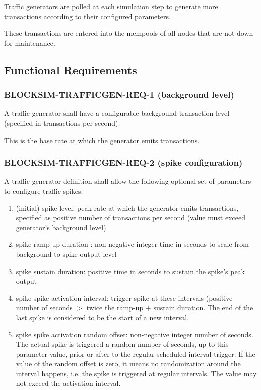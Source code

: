 \documentclass{scrreprt}
\begin{document}
Traffic generators are polled at each simulation step to generate more
transactions according to their configured parameters.

These transactions are entered into the mempools of all nodes that are not
down for maintenance.


\subsection{Functional Requirements}

\subsubsection{BLOCKSIM-TRAFFICGEN-REQ-1 (background level)}

A traffic generator shall have a configurable background transaction level
(specified in transactions per second).

This is the base rate at which the generator emits transactions.

\subsubsection{BLOCKSIM-TRAFFICGEN-REQ-2 (spike configuration)}

A traffic generator definition shall allow the following optional set of parameters to configure
traffic spikes:

\begin{enumerate}
   \item (initial) spike level: peak rate at which the generator emits transactions, specified as positive number of transactions per second (value must exceed generator's background level)
   \item spike ramp-up duration : non-negative integer time in seconds to scale from background to spike output level
   \item spike sustain duration: positive time in seconds to sustain the spike's peak output
   \item spike spike activation interval: trigger spike at these intervals (positive number of seconds $>$ twice the ramp-up + sustain duration. The end of the last spike is considered to be the start of a new interval.
   \item spike spike activation random offset: non-negative integer number of seconds. The actual spike is triggered a random number of seconds, up to this parameter value, prior or after to the regular scheduled interval trigger. If the value of the random offset is zero, it means no randomization around the interval happens, i.e. the spike is triggered at regular intervals. The value may not exceed the activation interval.
\end{enumerate}
\end{document}
